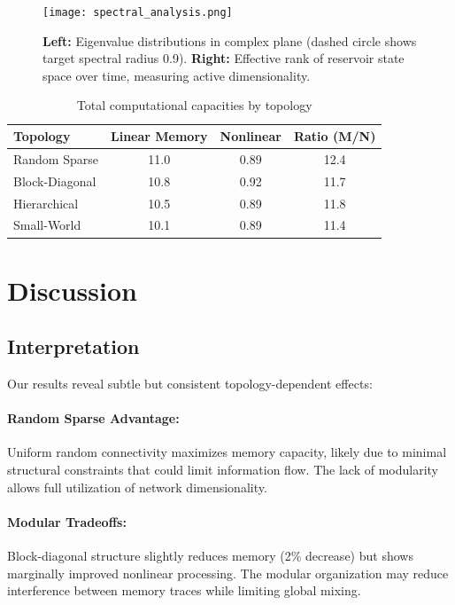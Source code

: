 \documentclass[11pt]{article}
\begin{document}
\begin{figure}[t]
\centering
\texttt{[image: spectral\_analysis.png]}
\caption{\textbf{Left:} Eigenvalue distributions in complex plane (dashed circle shows target spectral radius 0.9). \textbf{Right:} Effective rank of reservoir state space over time, measuring active dimensionality.}
\label{fig:spectral}
\end{figure}

\begin{table}[h]
\centering
\begin{tabular}{l|cc|c}
\hline
Topology & Linear Memory & Nonlinear & Ratio (M/N) \\
\hline
Random Sparse & 11.0 & 0.89 & 12.4 \\
Block-Diagonal & 10.8 & 0.92 & 11.7 \\
Hierarchical & 10.5 & 0.89 & 11.8 \\
Small-World & 10.1 & 0.89 & 11.4 \\
\hline
\end{tabular}
\caption{Total computational capacities by topology}
\label{tab:capacities}
\end{table}

\section{Discussion}

\subsection{Interpretation}

Our results reveal subtle but consistent topology-dependent effects:

\paragraph{Random Sparse Advantage:} Uniform random connectivity maximizes memory capacity, likely due to minimal structural constraints that could limit information flow. The lack of modularity allows full utilization of network dimensionality.

\paragraph{Modular Tradeoffs:} Block-diagonal structure slightly reduces memory (2\% decrease) but shows marginally improved nonlinear processing. The modular organization may reduce interference between memory traces while limiting global mixing.
\end{document}
